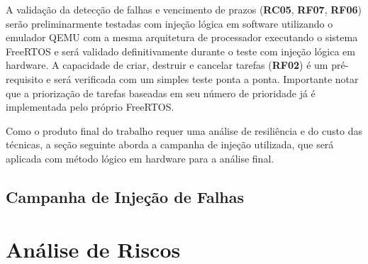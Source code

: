 A validação da detecção de falhas e vencimento de prazos (\textbf{RC05}, \textbf{RF07}, \textbf{RF06}) serão preliminarmente testadas com injeção lógica em software utilizando o emulador QEMU com a mesma arquitetura de processador executando o sistema FreeRTOS e será validado definitivamente durante o teste com injeção lógica em hardware. A capacidade de criar, destruir e cancelar tarefas (\textbf{RF02}) é um pré-requisito e será verificada com um simples teste ponta a ponta. Importante notar que a priorização de tarefas baseadas em seu número de prioridade já é implementada pelo próprio FreeRTOS.

Como o produto final do trabalho requer uma análise de resiliência e do custo das técnicas, a seção seguinte aborda a campanha de injeção utilizada, que será aplicada com método lógico em hardware para a análise final.

\subsection{Campanha de Injeção de Falhas} \label{subsec:campanhaInjecao}


\section{Análise de Riscos} \label{sec:analiseRiscos}

% 

